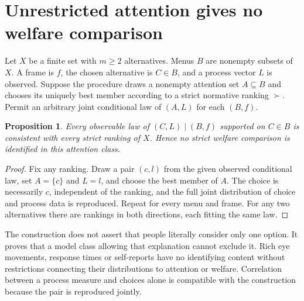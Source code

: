 \documentclass[11pt,a4paper]{article}
\newtheorem{proposition}[theorem]{Proposition}
\begin{document}
\section{Unrestricted attention gives no welfare comparison}
Let $X$ be a finite set with $m\ge2$ alternatives. Menus $B$ are nonempty subsets of $X$. A frame is $f$, the chosen alternative is $C\in B$, and a process vector $L$ is observed. Suppose the procedure draws a nonempty attention set $A\subseteq B$ and chooses its uniquely best member according to a strict normative ranking $\succ$. Permit an arbitrary joint conditional law of $(A,L)$ for each $(B,f)$.
\begin{proposition}
Every observable law of $(C,L)\mid(B,f)$ supported on $C\in B$ is consistent with every strict ranking of $X$. Hence no strict welfare comparison is identified in this attention class.
\end{proposition}
\begin{proof}
Fix any ranking. Draw a pair $(c,l)$ from the given observed conditional law, set $A=\{c\}$ and $L=l$, and choose the best member of $A$. The choice is necessarily $c$, independent of the ranking, and the full joint distribution of choice and process data is reproduced. Repeat for every menu and frame. For any two alternatives there are rankings in both directions, each fitting the same law.
\end{proof}
The construction does not assert that people literally consider only one option. It proves that a model class allowing that explanation cannot exclude it. Rich eye movements, response times or self-reports have no identifying content without restrictions connecting their distributions to attention or welfare. Correlation between a process measure and choices alone is compatible with the construction because the pair is reproduced jointly.
\end{document}
